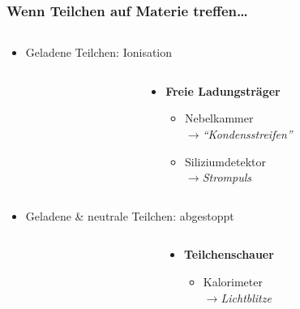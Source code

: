 \begin{frame}
  \frametitle{Wenn Teilchen auf Materie treffen\ldots}
  \begin{columns}[T]
    \begin{column}{0.65\textwidth}
      \begin{itemize}
      \item<2-> Geladene Teilchen: Ionisation
      \end{itemize}
      \begin{columns}[T]
        \begin{column}{0.4\textwidth}
          \centering
        \end{column}
        \begin{column}{0.6\textwidth}
          \begin{itemize}
          \item<2-> \textbf{Freie Ladungstr\"ager}
            \begin{itemize}
            \item<3-> Nebelkammer\\$\rightarrow$\emph{``Kondensstreifen''}
            \item<4-> Siliziumdetektor\\$\rightarrow$\emph{Strompuls}
            \end{itemize}
          \end{itemize}
        \end{column}
      \end{columns}
      \begin{itemize}
      \item<5-> Geladene \& neutrale Teilchen: abgestoppt
      \end{itemize}
      \begin{columns}[T]
        \begin{column}{0.4\textwidth}
          \centering
        \end{column}
        \begin{column}{0.6\textwidth}
          \begin{itemize}
          \item<5-> \textbf{Teilchenschauer}
            \begin{itemize}
            \item<6-> Kalorimeter\\$\rightarrow$\emph{Lichtblitze}

\end{itemize}
\end{itemize}
\end{column}
\end{columns}
\end{column}
\end{columns}
\end{frame}
